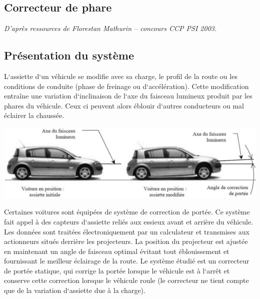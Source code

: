 \documentclass[10pt,fleqn]{article} %
\begin{document}

\vspace{8cm}
\pagestyle{fancy}
\thispagestyle{plain}


\def\columnseprulecolor{\color{ocre}}
\setlength{\columnseprule}{0.4pt} 
\begin{multicols}{2}


\section*{Correcteur de phare}
\begin{flushright}
\textit{D'après ressources de Florestan Mathurin -- concours CCP PSI 2003.}
\end{flushright}


\subsection*{Présentation du système}

L‘assiette d‘un véhicule se modifie avec sa charge, le profil de la route ou les
conditions de conduite (phase de freinage ou d‘accélération). Cette modification
entraîne une variation d‘inclinaison de l‘axe du faisceau lumineux produit par
les phares du véhicule. Ceux ci peuvent alors éblouir d‘autres conducteurs ou
mal éclairer la chaussée.


\begin{center}
 \includegraphics[width=.9\linewidth]{images/image1_1}
\end{center}
     
         Certaines voitures sont équipées de système de correction de portée. Ce
système fait appel à
des capteurs d‘assiette reliés aux essieux avant et arrière du véhicule. Les
données sont traitées
électroniquement par un calculateur et transmises aux actionneurs situés
derrière les projecteurs. La
position du projecteur est ajustée en maintenant un angle de faisceau optimal
évitant tout
éblouissement et fournissant le meilleur éclairage de la route.
Le système étudié est un correcteur de portée statique, qui corrige la portée
lorsque le véhicule est à
l‘arrêt et conserve cette correction lorsque le véhicule roule (le correcteur ne
tient compte que de la
variation d‘assiette due à la charge).


\end{multicols}
\end{document}
